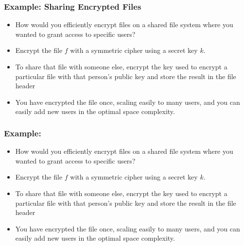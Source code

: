 \documentclass[handout]{beamer}
\begin{document}
\begin{frame}
    \frametitle{Example: Sharing Encrypted Files}
    \pause
    \begin{itemize}
        \item How would you efficiently encrypt files on a shared file system where you wanted to grant access to specific users? \pause
        \item Encrypt the file \(f\) with a symmetric cipher using a secret key \(k\). \pause
        \item To share that file with someone else, encrypt the key used to encrypt a particular file with that person's public key and store the result in the file header \pause
        \item You have encrypted the file once, scaling easily to many users, and you can easily add new users in the optimal space complexity.
    \end{itemize}
\end{frame}

\begin{frame}
    \frametitle{Example: }
    \pause
    \begin{itemize}
        \item How would you efficiently encrypt files on a shared file system where you wanted to grant access to specific users? \pause
        \item Encrypt the file \(f\) with a symmetric cipher using a secret key \(k\). \pause
        \item To share that file with someone else, encrypt the key used to encrypt a particular file with that person's public key and store the result in the file header \pause
        \item You have encrypted the file once, scaling easily to many users, and you can easily add new users in the optimal space complexity.
    \end{itemize}
\end{frame}
\end{document}
